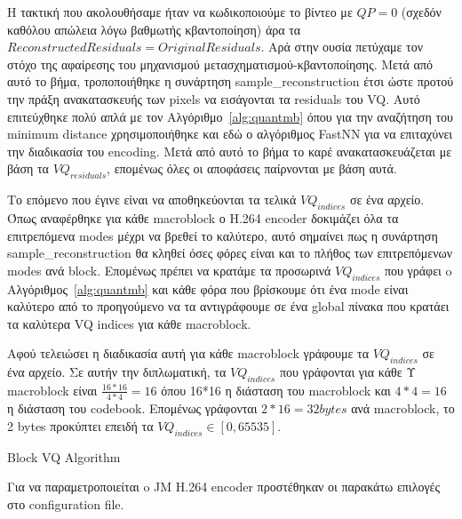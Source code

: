 \indent Η τακτική που ακολουθήσαμε ήταν να κωδικοποιούμε το βίντεο με $QP=0$ (σχεδόν καθόλου απώλεια λόγω βαθμωτής κβαντοποίηση) άρα τα $Reconstructed Residuals = Original Residuals$. Αρά στην ουσία πετύχαμε τον στόχο της αφαίρεσης του μηχανισμού μετασχηματισμού-κβαντοποίησης. Μετά από αυτό το βήμα, τροποποιήθηκε η συνάρτηση sample\_reconstruction έτσι ώστε προτού την πράξη ανακατασκευής των pixels να εισάγονται τα residuals του VQ. Αυτό επιτεύχθηκε πολύ απλά με τον Αλγόριθμο~\ref{alg:quantmb} όπου για την αναζήτηση του minimum distance χρησιμοποιήθηκε και εδώ ο αλγόριθμος FastNN για να επιταχύνει την διαδικασία του encoding. Μετά από αυτό το βήμα το καρέ ανακατασκευάζεται με βάση τα $VQ_{residuals}$, επομένως όλες οι αποφάσεις παίρνονται με βάση αυτά.

\indent Το επόμενο που έγινε είναι να αποθηκεύονται τα τελικά $VQ_{indices}$ σε ένα αρχείο. Όπως αναφέρθηκε για κάθε macroblock ο H.264 encoder δοκιμάζει όλα τα επιτρεπόμενα modes μέχρι να βρεθεί το καλύτερο, αυτό σημαίνει πως η συνάρτηση sample\_reconstruction θα κληθεί όσες φόρες είναι και το πλήθος των επιτρεπόμενων modes ανά block. Επομένως πρέπει να κρατάμε τα προσωρινά $VQ_{indices}$ που γράφει o Αλγόριθμος~\ref{alg:quantmb} και κάθε φόρα που βρίσκουμε ότι ένα mode είναι καλύτερο από το προηγούμενο να τα αντιγράφουμε σε ένα global πίνακα που κρατάει τα καλύτερα VQ indices για κάθε macroblock.

\indent Αφού τελειώσει η διαδικασία αυτή για κάθε macroblock γράφουμε τα $VQ_{indices}$ σε ένα αρχείο. Σε αυτήν την διπλωματική, τα $VQ_{indices}$ που γράφονται για κάθε Υ macroblock είναι $\frac{16*16}{4*4}=16$ όπου 16*16 η διάσταση του macroblock και $4*4=16$ η διάσταση του codebook. Επομένως γράφονται $2*16 = 32bytes$ ανά macroblock, το 2 bytes προκύπτει επειδή τα $VQ_{indices}\in[0,65535]$.

\begin{algorithm}[h]
\begin{algorithmic}[1]
\EndFor
\EndFunction
\end{algorithmic}
\caption{Block VQ Algorithm}
\label{alg:quantmb}
\end{algorithm}

\indent Για να παραμετροποιείται o JM Η.264 encoder προστέθηκαν οι παρακάτω επιλογές στο configuration file.

